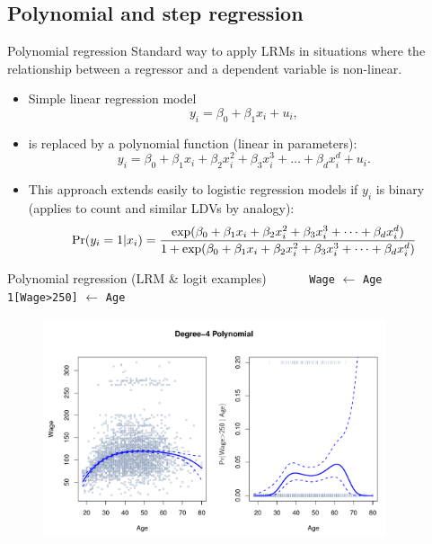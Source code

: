 \documentclass{beamer}
\begin{document}
\subsection{Polynomial and step regression}
\begin{frame}{Polynomial regression}
Standard way to apply LRMs in situations where the relationship between a regressor and a dependent variable is non-linear.\\ \smallskip
\begin{itemize}
    \item Simple linear regression model $$y_i = \beta_0 + \beta_1 x_i + u_i,$$
    \item is replaced by a polynomial function (linear in parameters): 
    $$ y_i = \beta_0 + \beta_1 x_i + \beta_2 x_i^2 + \beta_3 x_i^3 + \dots  + \beta_d x_i^d + u_i .$$
    \item This approach extends easily to logistic regression models if $y_i$ is binary (applies to count and similar LDVs by analogy):
    $$\textnormal{Pr}(y_i=1|x_i) 
    = \frac{\exp(\beta_0 + \beta_1 x_i + \beta_2 x_i^2 + \beta_3 x_i^3 + \dots  + \beta_d x_i^d)}{1 + \exp(\beta_0 + \beta_1 x_i + \beta_2 x_i^2 + \beta_3 x_i^3 + \dots  + \beta_d x_i^d)} $$
    
\end{itemize}
\end{frame}
\begin{frame}{Polynomial regression (LRM \& logit examples)}
\centering
\medskip
\texttt{~~~~~~Wage} $\leftarrow$ \texttt{Age~~~~~~} \qquad \qquad \texttt{1[Wage>250]} $\leftarrow$ \texttt{Age}\\

\begin{figure}
  \centering
  \includegraphics[trim=0cm 0cm 0cm 0cm, clip=true, width=0.9\textwidth]{IMG/ISLR71.pdf}
\end{figure}
\end{frame}
\end{document}
